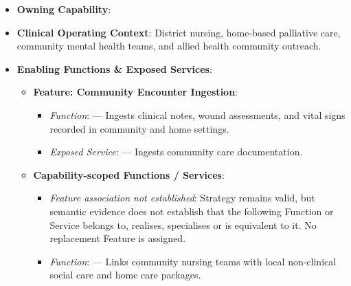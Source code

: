 \begin{itemize}

\item
\textbf{Owning Capability}: \texttt{}



\item
\textbf{Clinical Operating Context}: District nursing, home-based palliative care, community mental health teams, and allied health community outreach.



\item
\textbf{Enabling Functions \& Exposed Services}:


\begin{itemize}

\item
\textbf{Feature: Community Encounter Ingestion}:


\begin{itemize}

\item
\emph{Function}: \texttt{} — Ingests clinical notes, wound assessments, and vital signs recorded in community and home settings.



\item
\emph{Exposed Service}: \texttt{} — Ingests community care documentation.



\end{itemize}


\item
\textbf{Capability-scoped Functions /\allowbreak{} Services}:


\begin{itemize}

\item
\emph{Feature association not established}: Strategy \texttt{} remains valid, but semantic evidence does not establish that the following Function or Service belongs to, realises, specialises or is equivalent to it. No replacement Feature is assigned.



\item
\emph{Function}: \texttt{} — Links community nursing teams with local non-clinical social care and home care packages.




\end{itemize}
\end{itemize}
\end{itemize}

